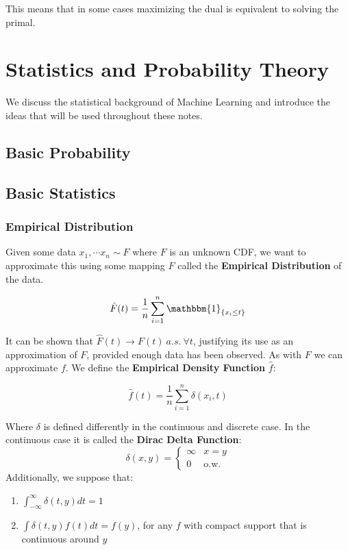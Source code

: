 \documentclass[]{article}
\theoremstyle{mattstyle}
\theoremstyle{definition}
\begin{document}
This means that in some cases maximizing the dual is equivalent to solving the primal.

\newpage

\section{Statistics and Probability Theory}

We discuss the statistical background of Machine Learning and introduce the ideas that will be used throughout these notes.

\subsection{Basic Probability}



\subsection{Basic Statistics}

\subsubsection{Empirical Distribution}\label{sec:empdist}

Given some data \(x_1, \cdots x_n \sim F\) where $F$ is an unknown CDF, we want to approximate this using some mapping $\hat{F}$ called the \textbf{Empirical Distribution} of the data.

\begin{equation}
	\hat{F}(t) = \frac{1}{n}\sum_{i=1}^n \mathbbm{1}_{\{x_i \le t\}}
\end{equation} 

It can be shown that $\hat{F}(t) \rightarrow F(t) \ a.s.\ \forall t$, justifying its use as an approximation of $F$, provided enough data has been observed. As with $F$ we can approximate $f$. We define the \textbf{Empirical Density Function} $\hat{f}$:

\begin{equation}
	\hat{f}(t) = \frac{1}{n}\sum_{i=1}^n \delta(x_i, t)
\end{equation}

Where $\delta$ is defined differently in the continuous and discrete case. In the continuous case it is called the \textbf{Dirac Delta Function}:
	\begin{equation}
		\delta(x,y) = \begin{cases}
		\infty & x=y \\
		0 & \text{o.w.}
	\end{cases}
	\end{equation}
	Additionally, we suppose that:
	\begin{enumerate}
		\item $\int_{-\infty}^{\infty} \delta(t,y)dt = 1$
		\item $\int \delta(t,y) f(t) dt = f(y)$, for any $f$ with compact support that is continuous around $y$
	\end{enumerate}
\end{document}
